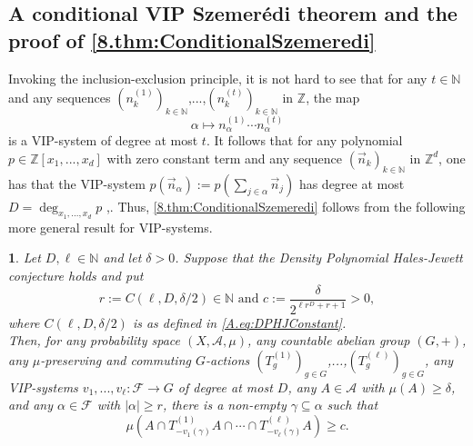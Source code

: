 \documentclass[11pt,american,preprint]{elsarticle}
\numberwithin{equation}{section}
\theoremstyle{plain}
\newtheorem{thm}{\protect\theoremname}[section]
\theoremstyle{plain*}
\theoremstyle{plain}
\theoremstyle{plain*}
\theoremstyle{plain}
\theoremstyle{plain*}
\theoremstyle{remark}
\theoremstyle{remark*}
\theoremstyle{remark}
\theoremstyle{remark*}
\theoremstyle{remark}
\theoremstyle{remark*}
\theoremstyle{plain}
\theoremstyle{definition}
\theoremstyle{plain}
\theoremstyle{plain} %
\providecommand{\theoremname}{Theorem}
\newcommand{\N}{\mathbb{N}}
\newcommand{\Z}{\mathbb{Z}}
\begin{document}
\subsection{A conditional VIP Szemer{\'e}di theorem and the proof of \cref{8.thm:ConditionalSzemeredi}}\label{Sec:A3}
Invoking the inclusion-exclusion principle, it is not hard to see that for any $t\in \N$ and any sequences $(n_k^{(1)})_{k\in\N}$,...,$(n_k^{(t)})_{k\in\N}$ in $\Z$, the map 
$$\alpha\mapsto n_\alpha^{(1)}\cdots n_\alpha^{(t)}$$ 
is a VIP-system of degree at most $t$. It follows that for any polynomial $p\in\Z[x_1,...,x_d]$  with zero constant term and any sequence $(\vec n_k)_{k\in\N}$ in $\Z^d$, one has that the VIP-system  $p(\vec n_\alpha):=p(\sum_{j\in\alpha}\vec n_j)$ has degree at most  $D=\deg_{x_1,...,x_d}p$ \cite[Proof of Theorem 1.8]{BFM},\cite[p. 1001]{BHM}.  
Thus, \cref{8.thm:ConditionalSzemeredi} follows from the following more general result for VIP-systems.
 \begin{thm}\label{8.ConditionalSzemeredi}
Let $D,\ell\in\N$ and let $\delta>0$. Suppose that the Density Polynomial Hales-Jewett conjecture holds and put  
$$r:=C(\ell,D,\delta/2)\in\N\text{ and }  c:=\frac{\delta}{2^{\ell r^D+r+1}}>0,$$
where $C(\ell,D,\delta/2)$ is as defined in \eqref{A.eq:DPHJConstant}.\\
Then, for any probability space $(X,\mathcal A,\mu)$, any countable abelian group $(G,+)$, any $\mu$-preserving and commuting $G$-actions $(T^{(1)}_g)_{g\in G}$,...,$(T^{(\ell)}_g)_{g\in G}$, any VIP-systems $v_{1},...,v_{\ell}:\mathcal F\rightarrow G$ of degree at most $D$, any $A\in\mathcal A$ with $\mu(A)\geq \delta$, and any $\alpha\in\mathcal F$ with $|\alpha|\geq r$, there 
is  a non-empty $\gamma\subseteq \alpha$ such that 
 \begin{equation}\label{7.eq:GammaREturn}
\mu(A\cap T_{-v_1(\gamma)}^{(1)}A\cap\cdots\cap  T_{-v_\ell(\gamma)}^{(\ell)}A)\geq c.
     \end{equation}
 \end{thm}
\end{document}

